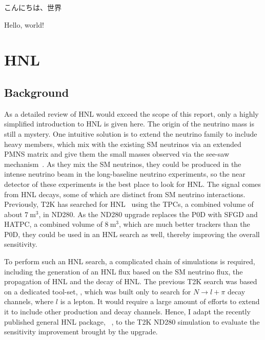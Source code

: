 \begin{savequote}[8cm]
こんにちは、世界

Hello, world!
\end{savequote}

\chapter{\label{ch:hnl}HNL} 

\minitoc

    \section{Background}
        As a detailed review of HNL would exceed the scope of this report, only a highly simplified introduction to HNL is given here. 
        The origin of the neutrino mass is still a mystery. 
        One intuitive solution is to extend the neutrino family to include heavy members, which mix with the existing SM neutrinos via an extended PMNS matrix and give them the small masses observed via the see-saw mechanism~\cite{Abada:2007ux}. 
        As they mix the SM neutrinos, they could be produced in the intense neutrino beam in the long-baseline neutrino experiments, so the near detector of these experiments is the best place to look for HNL. 
        The signal comes from HNL decays, some of which are distinct from SM neutrino interactions. 
        Previously, T2K has searched for HNL~\cite{T2K:2019jwa} using the TPCs, a combined volume of about $7~\textrm{m}^3$, in ND280. As 
        the ND280 upgrade replaces the P0D with SFGD and HATPC, a combined volume of $8~\textrm{m}^3$, which are much better trackers than the P0D, they could be used in an HNL search as well, thereby improving the overall sensitivity. 

        To perform such an HNL search, a complicated chain of simulations is required, including the generation of an HNL flux based on the SM neutrino flux, the propagation of HNL and the decay of HNL. 
        The previous T2K search was based on a dedicated tool-set, , which was built only to search for $N\rightarrow l + \pi$ decay channels, where $l$ is a lepton. 
        It would require a large amount of efforts to extend it to include other production and decay channels. 
        Hence, I adapt the recently published general HNL package, ~\cite{Plows:2022gxc}, to the T2K ND280 simulation to evaluate the sensitivity improvement brought by the upgrade.

